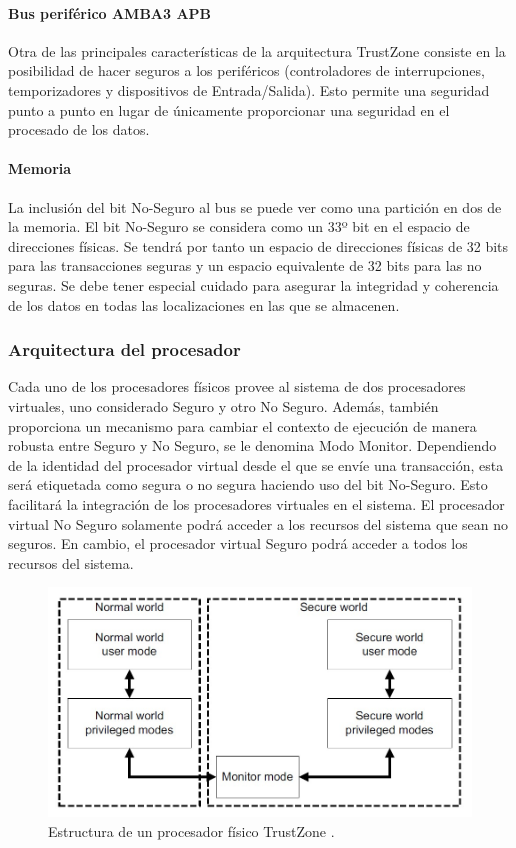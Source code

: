 \paragraph{Bus periférico AMBA3 APB}

Otra de las principales características de la arquitectura TrustZone consiste en la posibilidad de hacer seguros a los periféricos (controladores de interrupciones, temporizadores y dispositivos de Entrada/Salida). Esto permite una seguridad punto a punto en lugar de únicamente proporcionar una seguridad en el procesado de los datos.

\paragraph{Memoria}

La inclusión del bit No-Seguro al bus se puede ver como una partición en dos de la memoria. El bit No-Seguro se considera como un 33º bit en el espacio de direcciones físicas. Se tendrá por tanto un espacio de direcciones físicas de 32 bits para las transacciones seguras y un espacio equivalente de 32 bits para las no seguras. Se debe tener especial cuidado para asegurar la integridad y coherencia de los datos en todas las localizaciones en las que se almacenen.

\subsubsection{Arquitectura del procesador}
Cada uno de los procesadores físicos provee al sistema de dos procesadores virtuales, uno considerado Seguro y otro No Seguro. Además, también proporciona un mecanismo para cambiar el contexto de ejecución de manera robusta entre Seguro y No Seguro, se le denomina Modo Monitor. Dependiendo de la identidad del procesador virtual desde el que se envíe una transacción, esta será etiquetada como segura o no segura haciendo uso del bit No-Seguro. Esto facilitará la integración de los procesadores virtuales en el sistema. El procesador virtual No Seguro solamente podrá acceder a los recursos del sistema que sean no seguros. En cambio, el procesador virtual Seguro podrá acceder a todos los recursos del sistema. \newline


\begin{figure}
	\centering
	\includegraphics[width=1\textwidth]{imagenes/monitor.jpg}
	\caption{\label{fig1}Estructura de un procesador físico TrustZone \cite{trustzone}.}
\end{figure}


